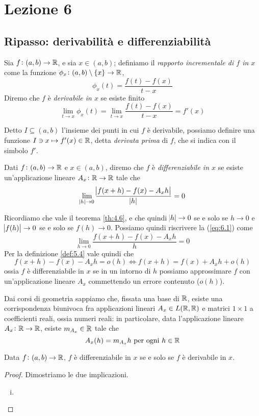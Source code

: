 \section{Lezione 6}
\subsection{Ripasso: derivabilità e differenziabilità}
\begin{definition}
    \label{def:6.1}
    Sia $f\colon(a,b)\to\amsbb{R}$, e sia $x\in(a,b)$; definiamo il \emph{rapporto incrementale di $f$ in $x$} come la funzione $\phi_x \colon (a,b) \setminus \{x\} \to \amsbb{R}$,
    \[
    \phi_x(t) = \frac{f(t)-f(x)}{t-x}
    \]
    Diremo che $f$ è \emph{derivabile in $x$} se esiste finito
    \[
    \lim_{t\to x} \phi_x(t) = \lim_{t\to x} \frac{f(t)-f(x)}{t-x} = f'(x)
    \]
\end{definition}
\begin{remark}
    Detto $I\subseteq (a,b)$ l'insieme dei punti in cui $f$ è derivabile, possiamo definire una funzione $ I\ni x \mapsto f'(x)\in \amsbb{R}$, detta \emph{derivata prima} di $f$, che si indica con il simbolo $f'$.
\end{remark}
\begin{definition}
    \label{def:6.2}
    Dati $f\colon(a,b)\to\amsbb{R}$ e $x\in(a,b)$, diremo che $f$ è \emph{differenziabile in $x$} se esiste un'applicazione lineare $A_x\colon\amsbb{R}\to \amsbb{R}$ tale che
    \begin{equation}
        \label{eq:6.1}
        \lim_{\abs{h}\to0}\frac{\abs{f(x+h)-f(x)-A_x h}}{\abs{h}}=0
    \end{equation}
\end{definition}
\begin{remark}
    Ricordiamo che vale il teorema \ref{th:4.6}, e che quindi $\abs{h}\to 0$ se e solo se $h\to0$ e $\abs{f(h)}\to0$ se e solo se $f(h)\to0$. Possiamo quindi riscrivere la (\ref{eq:6.1}) come
    \[
    \lim_{h\to 0} \frac{f(x+h)-f(x)-A_x h}{h}=0
    \]
    Per la definizione \ref{def:5.4} vale quindi che
    \[
    f(x+h)-f(x)-A_xh = o(h) \iff f(x+h) = f(x) + A_x h+o(h)
    \]
    ossia $f$ è differenziabile in $x$ se in un intorno di $h$ possiamo approssimare $f$ con un'applicazione lineare $A_x$ commettendo un errore contenuto ($o(h)$).
\end{remark}
\begin{remark}
    Dai corsi di geometria sappiamo che, fissata una base di $\amsbb{R}$, esiste una corrispondenza biunivoca fra applicazioni lineari $A_x\in L(\amsbb{R}, \amsbb{R})$ e matrici $1\times 1$ a coefficienti reali, ossia numeri reali: in particolare, data l'applicazione lineare $A_x\colon \amsbb{R}\to\amsbb{R}$, esiste $m_{A_x}\in\amsbb{R}$ tale che
    \[
    A_x(h) = m_{A_x}h \ \text{per ogni} \ h\in\amsbb{R}
    \]
\end{remark}
\begin{theorem}
    \label{th:6.1}
    Data $f\colon (a,b)\to\amsbb{R}$, $f$ è differenziabile in $x$ se e solo se $f$ è derivabile in $x$.
\end{theorem}
\begin{proof}
    Dimostriamo le due implicazioni.
    \begin{enumerate}[(i)]
        \item 
    \end{enumerate}
\end{proof}
